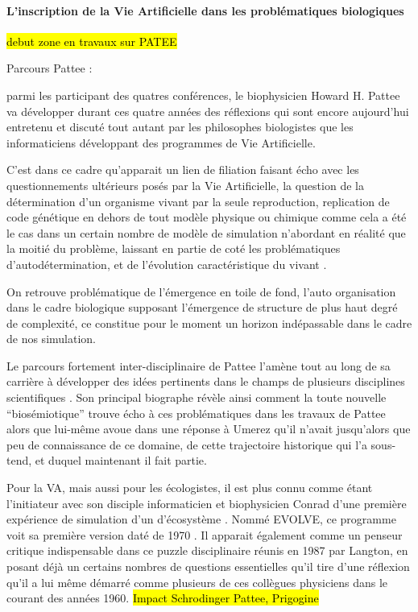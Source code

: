 \paragraph{L'inscription de la Vie Artificielle dans les problématiques biologiques}
\label{p:va_bio}

\hl{debut zone en travaux sur PATEE}

Parcours Pattee : 

parmi les participant des quatres conférences, le biophysicien Howard H. Pattee va développer durant ces quatre années des réflexions qui sont encore aujourd'hui entretenu et discuté tout autant par les philosophes biologistes que les informaticiens développant des programmes de Vie Artificielle.

C'est dans ce cadre qu'apparait un lien de filiation faisant écho avec les questionnements ultérieurs posés par la Vie Artificielle, la question de la détermination d'un organisme vivant par la seule reproduction, replication de code génétique en dehors de tout modèle physique ou chimique comme cela a été le cas dans un certain nombre de modèle de simulation n'abordant en réalité que la moitié du problème, laissant en partie de coté les problématiques d'autodétermination, et de l'évolution caractéristique du vivant \autocite{Mossio}.

On retrouve problématique de l'émergence en toile de fond, l'auto organisation dans le cadre biologique supposant l'émergence de structure de plus haut degré de complexité, ce constitue pour le moment un horizon indépassable dans le cadre de nos simulation.


Le parcours fortement inter-disciplinaire de Pattee l'amène tout au long de sa carrière à développer des idées pertinents dans le champs de plusieurs disciplines scientifiques \textcite{Umerez2001}. Son principal biographe  \textcite{Umerez2009} révèle ainsi comment la toute nouvelle \enquote{biosémiotique} trouve écho à ces problématiques dans les travaux de Pattee alors que lui-même avoue dans une réponse à Umerez \autocite{Pattee2009} qu'il n'avait jusqu'alors que peu de connaissance de ce domaine, de cette trajectoire historique qui l'a sous-tend, et duquel maintenant il fait partie. 

Pour la VA, mais aussi pour les écologistes, il est plus connu comme étant l'initiateur avec son disciple informaticien et biophysicien Conrad d'une première expérience de simulation d'un d'écosystème . Nommé EVOLVE, ce programme  voit sa première version daté de 1970 \autocites{Conrad1970, Pattee2002}. Il apparait également comme un penseur critique indispensable dans ce puzzle disciplinaire réunis en 1987 par Langton, en posant déjà un certains nombres de questions essentielles qu'il tire d'une réflexion qu'il a lui même démarré comme plusieurs de ces collègues physiciens dans le courant des années 1960. \hl{Impact Schrodinger Pattee, Prigogine} \autocite{Pattee1988}

